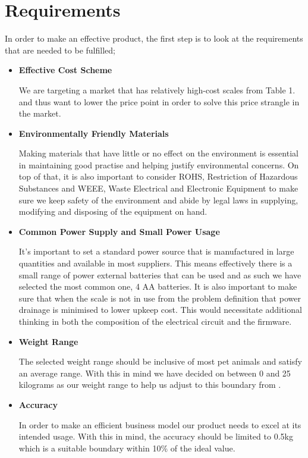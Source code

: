 \section{Requirements}
In order to make an effective product, the first step is to look at the requirements that are needed to be fulfilled;
\begin{itemize}
\item \textbf{Effective Cost Scheme}

We are targeting a market that has relatively high-cost scales from Table 1. and thus want to lower the price point in order to solve this price strangle in the market.

\item \textbf{Environmentally Friendly Materials}

Making materials that have little or no effect on the environment is essential in maintaining good practise and helping justify environmental concerns. On top of that, it is also important to consider ROHS, Restriction of Hazardous Substances and WEEE, Waste Electrical and Electronic Equipment to make sure we keep safety of the environment and abide by legal laws in supplying, modifying and disposing of the equipment on hand.

\item \textbf{Common Power Supply and Small Power Usage}

It's important to set a standard power source that is manufactured in large quantities and available in most suppliers. This means effectively there is a small range of power external batteries that can be used and as such we have selected the most common one, 4 AA batteries. It is also important to make sure that when the scale is not in use from the problem definition that power drainage is minimised to lower upkeep cost. This would necessitate additional thinking in both the composition of the electrical circuit and the firmware.

\item \textbf{Weight Range}

The selected weight range should be inclusive of most pet animals and satisfy an average range. With this in mind we have decided on between 0 and 25 kilograms as our weight range to help us adjust to this boundary from \cite{pd6}.

\item \textbf{Accuracy}

In order to make an efficient business model our product needs to excel at its intended usage. With this in mind, the accuracy should be limited to 0.5kg which is a suitable boundary within 10\% of the ideal value.


\end{itemize}
